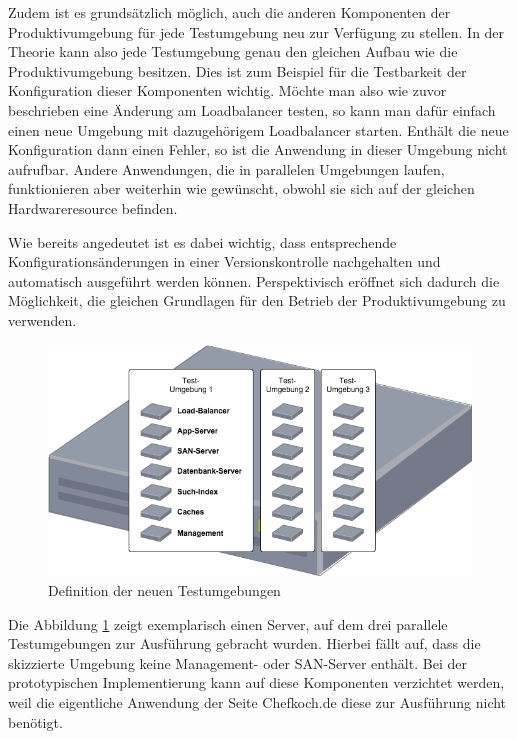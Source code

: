 Zudem ist es grundsätzlich möglich, auch die anderen Komponenten der Produktivumgebung für jede Testumgebung neu zur Verfügung zu stellen. In der Theorie kann also jede Testumgebung genau den gleichen Aufbau wie die Produktivumgebung besitzen. Dies ist zum Beispiel für die Testbarkeit der Konfiguration dieser Komponenten wichtig. Möchte man also wie zuvor beschrieben eine Änderung am Loadbalancer testen, so kann man dafür einfach einen neue Umgebung mit dazugehörigem Loadbalancer starten. Enthält die neue Konfiguration dann einen Fehler, so ist die Anwendung in dieser Umgebung nicht aufrufbar. Andere Anwendungen, die in parallelen Umgebungen laufen, funktionieren aber weiterhin wie gewünscht, obwohl sie sich auf der gleichen Hardwareresource befinden.

Wie bereits angedeutet ist es dabei wichtig, dass entsprechende Konfigurationsänderungen in einer Versionskontrolle nachgehalten und automatisch ausgeführt werden können. Perspektivisch eröffnet sich dadurch die Möglichkeit, die gleichen Grundlagen für den Betrieb der Produktivumgebung zu verwenden.

\begin{figure}[!ht]
  \begin{center}
    \includegraphics[width=14cm]{bilder/Untersuchungs-Umgebung.png}
    \caption{Definition der neuen Testumgebungen}
    \label{neue-test}
  \end{center}
\end{figure}

Die Abbildung \ref{neue-test} zeigt exemplarisch einen Server, auf dem drei parallele Testumgebungen zur Ausführung gebracht wurden. Hierbei fällt auf, dass die skizzierte Umgebung keine Management- oder SAN-Server enthält. Bei der prototypischen Implementierung kann auf diese Komponenten verzichtet werden, weil die eigentliche Anwendung der Seite Chefkoch.de diese zur Ausführung nicht benötigt.


